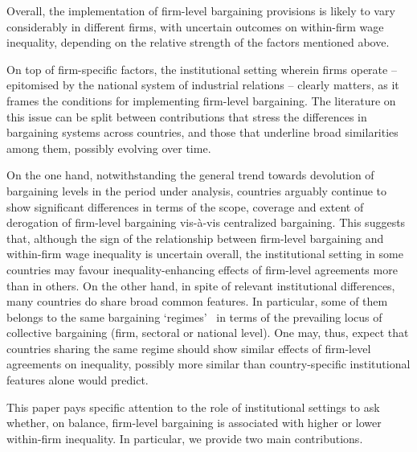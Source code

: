 \documentclass[12pt]{article}
\begin{document}
Overall, the implementation of firm-level bargaining provisions is likely to vary considerably in different firms, with uncertain outcomes on within-firm wage inequality, depending on the relative strength of the factors mentioned above.

On top of firm-specific factors, the institutional setting wherein firms operate -- epitomised by the national system of industrial relations -- clearly matters, as it frames the conditions for implementing firm-level bargaining. The literature on this issue can be split between contributions that stress the differences in bargaining systems across countries, and those that underline broad similarities among them, possibly evolving over time.

On the one hand, notwithstanding the general trend towards devolution of bargaining levels in the period under analysis, countries arguably continue to show significant differences in terms of the scope, coverage and extent of derogation of firm-level bargaining vis-à-vis centralized bargaining. This suggests that, although the sign of the relationship between firm-level bargaining and within-firm wage inequality is uncertain overall, the institutional setting in some countries may favour inequality-enhancing effects of firm-level agreements more than in others. On the other hand, in spite of relevant institutional differences, many countries do share broad common features. In particular, some of them belongs to the same bargaining ‘regimes’~\citep{fulton.2013} in terms of the prevailing locus of collective bargaining (firm, sectoral or national level). One may, thus, expect that countries sharing the same regime should show similar effects of firm-level agreements on inequality, possibly more similar than country-specific institutional features alone would predict. 

This paper pays specific attention to the role of institutional settings to ask whether, on balance, firm-level bargaining is associated with higher or lower within-firm inequality. In particular, we provide two main contributions.
\end{document}
